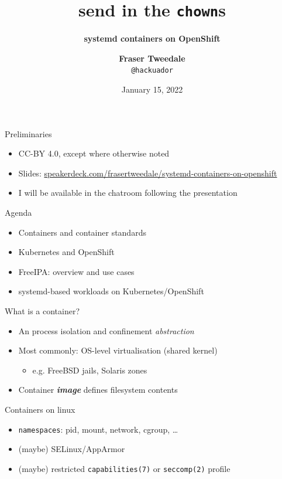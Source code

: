 \documentclass[ignorenonframetext,aspectratio=169,12pt]{beamer}
\title{\bf send in the {\tt chown}s}
\subtitle{\bf systemd containers on OpenShift}
\author{{\bf Fraser Tweedale}\\
    \texttt{@hackuador}\\
    \bigskip
    \def\svgwidth{4cm}
    }
\date{January 15, 2022}
\begin{document}
\frame{\titlepage}

\begin{frame}{Preliminaries}
\protect\hypertarget{preliminaries}{}
\begin{itemize}
    \item CC-BY 4.0, except where otherwise noted
    \item Slides:
      \href{https://speakerdeck.com/frasertweedale/systemd-containers-on-openshift}{speakerdeck.com/frasertweedale/systemd-containers-on-openshift}
    \item I will be available in the chatroom following the presentation
\end{itemize}
\end{frame}


\begin{frame}{Agenda}
\protect\hypertarget{agenda}{}

\begin{itemize}
    \item Containers and container standards
    \item Kubernetes and OpenShift
    \item FreeIPA: overview and use cases
    \item systemd-based workloads on Kubernetes/OpenShift
\end{itemize}

\end{frame}


\begin{frame}{What is a container?}
\protect\hypertarget{container-definition}{}

\begin{itemize}
    \item An process isolation and confinement {\em abstraction}
    \item Most commonly: OS-level virtualisation (shared kernel)
        \begin{itemize}
        \item e.g. FreeBSD jails, Solaris zones
        \end{itemize}
    \item Container \emph{\textbf{image}} defines filesystem contents
\end{itemize}

\end{frame}


\begin{frame}{Containers on linux}
\protect\hypertarget{container-linux}{}

\begin{itemize}
    \item {\tt namespaces}: pid, mount, network, cgroup, \ldots{}
    \item (maybe) SELinux/AppArmor
    \item (maybe) restricted \texttt{capabilities(7)} or
        \texttt{seccomp(2)} profile
\end{itemize}

\end{frame}
\end{document}
